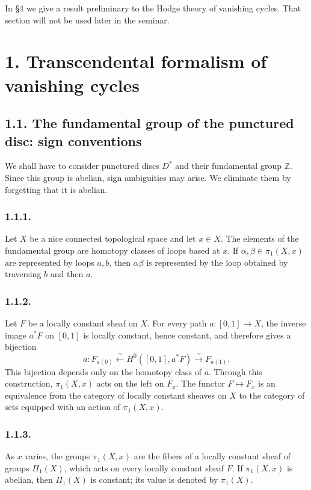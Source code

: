 In \S4 we give a result preliminary to the Hodge theory of vanishing
cycles.  That section will not be used later in the seminar.

\section*{1. Transcendental formalism of vanishing cycles}

\subsection*{1.1. The fundamental group of the punctured disc:
sign conventions}

We shall have to consider punctured discs $D^*$ and their fundamental
group $\mathbb Z$.  Since this group is abelian, sign ambiguities may
arise.  We eliminate them by forgetting that it is abelian.

\subsubsection*{1.1.1.}
Let $X$ be a nice connected topological space and let $x\in X$.
The elements of the fundamental group are homotopy classes of loops
based at $x$.  If $\alpha,\beta\in\pi_1(X,x)$ are represented by
loops $a,b$, then $\alpha\beta$ is represented by the loop obtained
by traversing $b$ and then $a$.

\subsubsection*{1.1.2.}
Let $F$ be a locally constant sheaf on $X$.  For every path
$a:[0,1]\longrightarrow X$, the inverse image $a^*F$ on $[0,1]$ is
locally constant, hence constant, and therefore gives a bijection
\[
a:F_{a(0)}
\xleftarrow{\ \sim\ }H^0([0,1],a^*F)
\xrightarrow{\ \sim\ }F_{a(1)}.
\]
This bijection depends only on the homotopy class of $a$.  Through
this construction, $\pi_1(X,x)$ acts on the left on $F_x$.  The
functor $F\longmapsto F_x$ is an equivalence from the category of
locally constant sheaves on $X$ to the category of sets equipped with
an action of $\pi_1(X,x)$.

\subsubsection*{1.1.3.}
As $x$ varies, the groups $\pi_1(X,x)$ are the fibers of a locally
constant sheaf of groups $\Pi_1(X)$, which acts on every locally
constant sheaf $F$.  If $\pi_1(X,x)$ is abelian, then $\Pi_1(X)$ is
constant; its value is denoted by $\pi_1(X)$.

